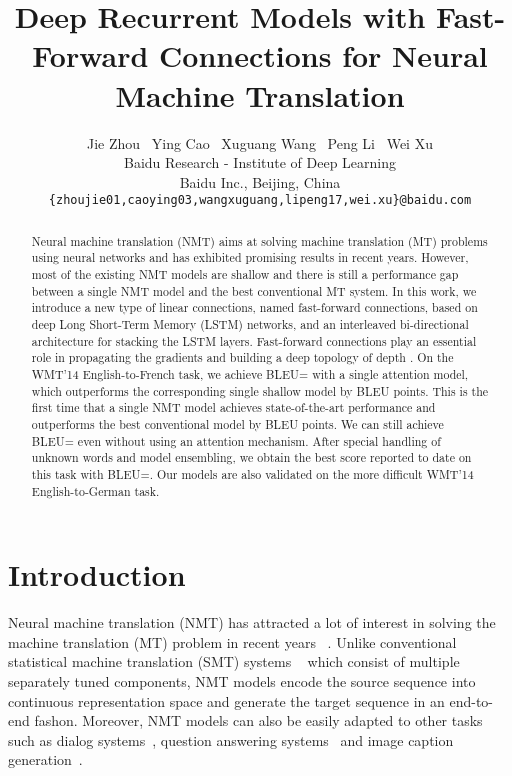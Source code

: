 \documentclass[11pt,letterpaper]{article}
\title{Deep Recurrent Models with Fast-Forward Connections for Neural Machine Translation}
\author{Jie Zhou \ Ying Cao \ Xuguang Wang \ Peng Li \ Wei Xu \\
Baidu Research - Institute of Deep Learning \\
Baidu Inc., Beijing, China \\
{\tt \{zhoujie01,caoying03,wangxuguang,lipeng17,wei.xu\}@baidu.com} \\
}
\date{}
\newcommand{\change}[1]{}
\begin{document}
\maketitle
\begin{abstract}
  Neural machine translation (NMT) aims at solving machine translation (MT) \mbox{problems} using neural networks and has exhibited
  promising results in recent years.  \mbox{However}, most of the existing NMT models are shallow and there is still a performance gap
  between a \mbox{single} NMT model and the best \mbox{conventional} MT system.   In this work, we introduce a new type of linear
  connections, named fast-forward connections, based on deep Long Short-Term Memory (\mbox{LSTM}) networks, and an interleaved
  bi-directional architecture for stacking the LSTM layers.  Fast-forward connections play an essential role in propagating the
  gradients and building a deep topology of depth . On the WMT'14 English-to-French task, we \mbox{achieve} BLEU= with a
  single attention model, which outperforms the corresponding single shallow model by  BLEU points. This is the first time that a
  single NMT model achieves state-of-the-art performance and  outperforms the best conventional model by  BLEU points. We can still
  achieve BLEU= even without using an attention mechanism. After  special handling of unknown words and  model
  ensembling,  we obtain the best score reported to date \change{Is it the best score every reported? You can say "obtain the best score reported to
  date"} on this task with BLEU=. Our models are also  validated  on the more difficult WMT'14 English-to-German task.
\end{abstract}

\section{Introduction}

Neural machine translation (NMT) has attracted a lot of interest in solving the machine translation (MT) problem in recent
years ~\cite{Kalchbrenner-Blunsom-EMNLP2013,Sutskever-Le-NIPS2014,Bahdanau-Bengio-ICLR2015}. Unlike conventional statistical machine
translation (SMT) systems ~\cite{Koehn-Marcu-NAACL2003,Durrani-Heafield-WMT2014} which consist of multiple separately tuned components, NMT
models encode the source sequence into continuous representation \mbox{space} and generate the target sequence in an end-to-end
fashon. Moreover, NMT models can \mbox{also} be easily adapted to other tasks such as dialog
\mbox{systems}~\cite{Vinyals-Le-ICML2015}, question answering systems~\cite{Yu-Zhou-ARXIV2015} and  image caption
generation~\cite{Mao-Yuille-ICLR2015}.
\end{document}
